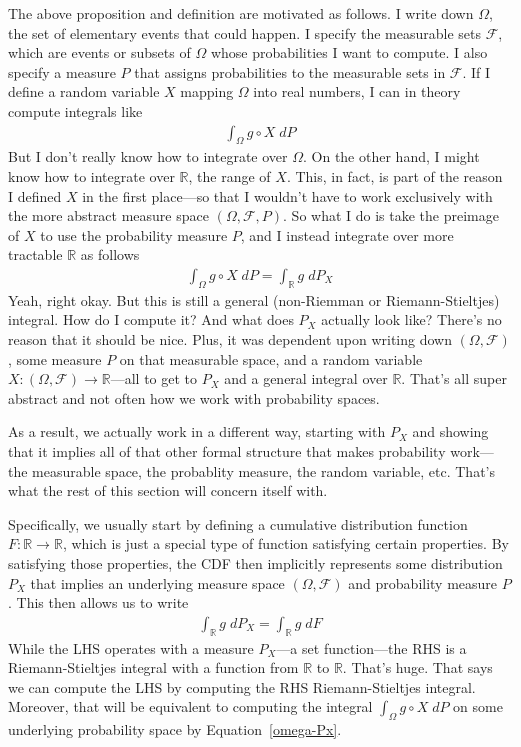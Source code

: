 \documentclass[12pt]{article}
\theoremstyle{plain}
\theoremstyle{definition}
\theoremstyle{remark}
\newcommand{\ra}{\rightarrow}
\newcommand{\sF}{\mathscr{F}}
\newcommand{\R}{\mathbb{R}}
\begin{document}
The above proposition and definition are motivated as follows. I write
down $\Omega$, the set of elementary events that could happen. I specify
the measurable sets $\sF$, which are events or subsets of $\Omega$ whose
probabilities I want to compute. I also specify a measure $P$ that
assigns probabilities to the measurable sets in $\sF$. If I define a
random variable $X$ mapping $\Omega$ into real numbers, I can in theory
compute integrals like
\begin{align*}
  \int_\Omega g\circ X \; dP
\end{align*}
But I don't really know how to integrate over $\Omega$. On the other
hand, I might know how to integrate over $\R$, the range of $X$. This,
in fact, is part of the reason I defined $X$ in the first place---so
that I wouldn't have to work exclusively with the more abstract measure
space $(\Omega,\sF,P)$. So what I do is take the preimage of $X$ to use
the probability measure $P$, and I instead integrate over more tractable
$\R$ as follows
\begin{align}
  \int_\Omega g\circ X \; dP
  =
  \int_\R g \; dP_X
  \label{omega-Px}
\end{align}
Yeah, right okay. But this is still a general (non-Riemman or
Riemann-Stieltjes) integral. How do I compute it? And what does $P_X$
actually look like? There's no reason that it should be nice.
Plus, it was dependent upon writing down $(\Omega,\sF)$, some measure
$P$ on that measurable space, and a random variable
$X:(\Omega,\sF)\ra\R$---all to get to $P_X$ and a general integral over
$\R$.  That's all super abstract and not often how we work with
probability spaces.

As a result, we actually work in a different way, starting with $P_X$
and showing that it implies all of that other formal structure that
makes probability work---the measurable space, the probablity measure,
the random variable, etc. That's what the rest of this section will
concern itself with.

Specifically, we usually start by defining a cumulative distribution
function $F:\R\ra\R$, which is just a special type of function
satisfying certain properties. By satisfying those properties, the CDF
then implicitly represents some distribution $P_X$ that implies an
underlying measure space $(\Omega,\sF)$ and probability measure $P$.
This then allows us to write
\begin{align*}
  \int_\R g \; dP_X = \int_\R g \; dF
\end{align*}
While the LHS operates with a measure $P_X$---a set function---the RHS
is a Riemann-Stieltjes integral with a function from $\R$ to $\R$.
That's huge. That says we can compute the LHS by computing the RHS
Riemann-Stieltjes integral. Moreover, that will be equivalent to
computing the integral $\int_\Omega g \circ X \; dP$ on some underlying
probability space by Equation~\ref{omega-Px}.
\end{document}
